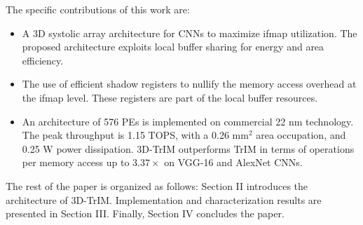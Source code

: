 The specific contributions of this work are:
\begin{itemize}
    \item A 3D systolic array architecture for CNNs to maximize ifmap utilization. The proposed architecture exploits local buffer sharing for energy and area efficiency. 
    \item The use of efficient shadow registers to nullify the memory access overhead at the ifmap level. These registers are part of the local buffer resources.
    \item An architecture of 576 PEs is implemented on commercial 22 nm technology. The peak throughput is 1.15 TOPS, with a 0.26 mm$^2$ area occupation, and 0.25 W power dissipation. 3D-TrIM outperforms TrIM in terms of operations per memory access up to $3.37\times$ on VGG-16 and AlexNet CNNs.
\end{itemize}

The rest of the paper is organized as follows: Section II introduces the architecture of 3D-TrIM. Implementation and characterization results are presented in Section III. Finally, Section IV concludes the paper.